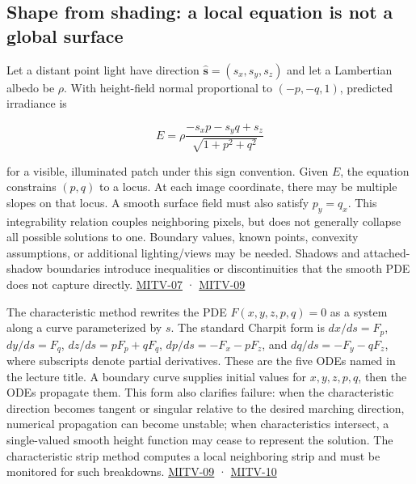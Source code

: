\subsection{Shape from shading: a local equation is not a global surface}\label{04-visual-computing-ii-ch032-shape-from-shading-a-local-equation-is-not-a-global-surface}

Let a distant point light have direction \(\hat{\mathbf s}=(s_x,s_y,s_z)\) and let a Lambertian albedo be \(\rho\). With height-field normal proportional to \((-p,-q,1)\), predicted irradiance is

\[
E=\rho\frac{-s_xp-s_yq+s_z}{\sqrt{1+p^2+q^2}}
\]

for a visible, illuminated patch under this sign convention. Given \(E\), the equation constrains \((p,q)\) to a locus. At each image coordinate, there may be multiple slopes on that locus. A smooth surface field must also satisfy \(p_y=q_x\). This integrability relation couples neighboring pixels, but does not generally collapse all possible solutions to one. Boundary values, known points, convexity assumptions, or additional lighting/views may be needed. Shadows and attached-shadow boundaries introduce inequalities or discontinuities that the smooth PDE does not capture directly. \hyperref[04-visual-computing-ii-ch036-mitv-07---gradient-space-reflectance-map-image-irradiance-equation-gnomonic-projection]{MITV-07} · \hyperref[04-visual-computing-ii-ch036-mitv-09---shape-from-shading-general-case---from-first-order-nonlinear-pde-to-five-odes]{MITV-09}

The characteristic method rewrites the PDE \(F(x,y,z,p,q)=0\) as a system along a curve parameterized by \(s\). The standard Charpit form is \(dx/ds=F_p\), \(dy/ds=F_q\), \(dz/ds=pF_p+qF_q\), \(dp/ds=-F_x-pF_z\), and \(dq/ds=-F_y-qF_z\), where subscripts denote partial derivatives. These are the five ODEs named in the lecture title. A boundary curve supplies initial values for \(x,y,z,p,q\), then the ODEs propagate them. This form also clarifies failure: when the characteristic direction becomes tangent or singular relative to the desired marching direction, numerical propagation can become unstable; when characteristics intersect, a single-valued smooth height function may cease to represent the solution. The characteristic strip method computes a local neighboring strip and must be monitored for such breakdowns. \hyperref[04-visual-computing-ii-ch036-mitv-09---shape-from-shading-general-case---from-first-order-nonlinear-pde-to-five-odes]{MITV-09} · \hyperref[04-visual-computing-ii-ch036-mitv-10---characteristic-strip-expansion-shape-from-shading-iterative-solutions]{MITV-10}


